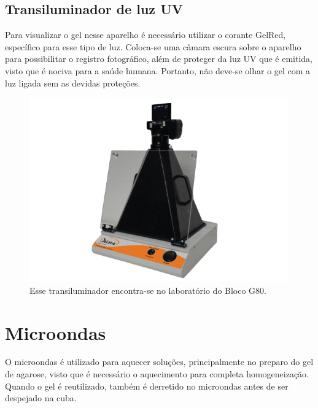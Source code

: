 \documentclass[
  letterpaper,
  DIV=11,
  numbers=noendperiod]{scrreprt}
\begin{document}
\hypertarget{transiluminador-de-luz-uv}{%
\subsection{Transiluminador de luz UV}\label{transiluminador-de-luz-uv}}

Para visualizar o gel nesse aparelho é necessário utilizar o corante
GelRed, específico para esse tipo de luz. Coloca-se uma câmara escura
sobre o aparelho para possibilitar o registro fotográfico, além de
proteger da luz UV que é emitida, visto que é nociva para a saúde
humana. Portanto, não deve-se olhar o gel com a luz ligada sem as
devidas proteções.

\begin{figure}

{\centering \includegraphics[width=\textwidth,height=3.125in]{figures/equipamentos/transiluminador_uv.png}

}

\caption{Esse transiluminador encontra-se no laboratório do Bloco G80.}

\end{figure}

\hypertarget{microondas}{%
\section{Microondas}\label{microondas}}

O microondas é utilizado para aquecer soluções, principalmente no
preparo do gel de agarose, visto que é necessário o aquecimento para
completa homogeneização. Quando o gel é reutilizado, também é derretido
no microondas antes de ser despejado na cuba.
\end{document}

